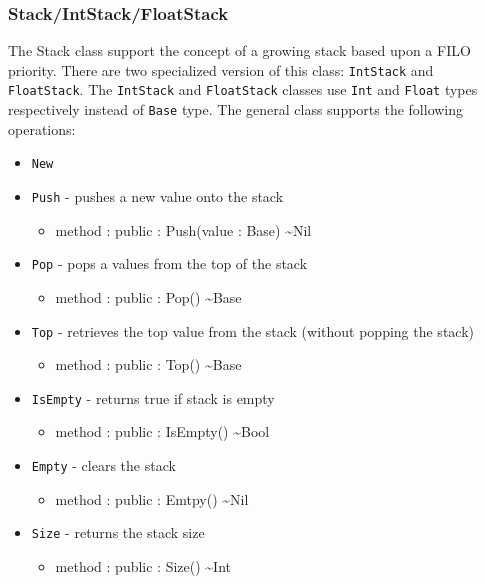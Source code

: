 \documentclass[11pt]{article}
\begin{document}
\subsubsection{Stack/IntStack/FloatStack}
The Stack class support the concept of a growing stack based upon a
FILO priority.  There are two specialized version of this class:
\texttt{IntStack} and \texttt{FloatStack}.  The \texttt{IntStack} and
\texttt{FloatStack} classes use \texttt{Int} and \texttt{Float} types
respectively instead of \texttt{Base} type.  The general class
supports the following operations:
\begin{itemize}
\item \texttt{New}
\item \texttt{Push} - pushes a new value onto the stack
  \begin{itemize}
  \item method : public : Push(value : Base) \textasciitilde Nil
  \end{itemize}
\item \texttt{Pop} - pops a values from the top of the stack
  \begin{itemize}
  \item method : public : Pop() \textasciitilde Base
  \end{itemize}
\item \texttt{Top} - retrieves the top value from the stack (without
  popping the stack)
  \begin{itemize}
  \item method : public : Top() \textasciitilde Base
  \end{itemize}
\item \texttt{IsEmpty} - returns true if stack is empty
  \begin{itemize}
  \item method : public : IsEmpty() \textasciitilde Bool
  \end{itemize}
\item \texttt{Empty} - clears the stack
  \begin{itemize}
  \item method : public : Emtpy() \textasciitilde Nil
  \end{itemize}
\item \texttt{Size} - returns the stack size
  \begin{itemize}
  \item method : public : Size() \textasciitilde Int
  \end{itemize}
\end{itemize}
\end{document}
